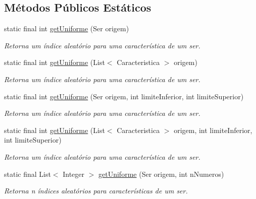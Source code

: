 \subsection*{Métodos Públicos Estáticos}
\begin{DoxyCompactItemize}
\item 
static final int \hyperlink{classic_1_1populacional_1_1utilidades_1_1_indice_aleatorio_ae36a71951fb007c177503efe61cd69cf}{get\-Uniforme} (Ser origem)
\begin{DoxyCompactList}\small\item\em Retorna um índice aleatório para uma característica de um ser. \end{DoxyCompactList}\item 
static final int \hyperlink{classic_1_1populacional_1_1utilidades_1_1_indice_aleatorio_aeb5e4cf0ec35489dc02c6d84a3d04744}{get\-Uniforme} (List$<$ Caracteristica $>$ origem)
\begin{DoxyCompactList}\small\item\em Retorna um índice aleatório para uma característica de um ser. \end{DoxyCompactList}\item 
static final int \hyperlink{classic_1_1populacional_1_1utilidades_1_1_indice_aleatorio_adfc01422d107da549e4925692d2a5514}{get\-Uniforme} (Ser origem, int limite\-Inferior, int limite\-Superior)
\begin{DoxyCompactList}\small\item\em Retorna um índice aleatório para uma característica de um ser. \end{DoxyCompactList}\item 
static final int \hyperlink{classic_1_1populacional_1_1utilidades_1_1_indice_aleatorio_ab63b5d88c777b08a27d9bf3510360132}{get\-Uniforme} (List$<$ Caracteristica $>$ origem, int limite\-Inferior, int limite\-Superior)
\begin{DoxyCompactList}\small\item\em Retorna um índice aleatório para uma característica de um ser. \end{DoxyCompactList}\item 
static final List$<$ Integer $>$ \hyperlink{classic_1_1populacional_1_1utilidades_1_1_indice_aleatorio_ad173cfec1a8b8386148439711460bd06}{get\-Uniforme} (Ser origem, int n\-Numeros)
\begin{DoxyCompactList}\small\item\em Retorna n índices aleatórios para características de um ser. \end{DoxyCompactList}\item 

\end{DoxyCompactItemize}
